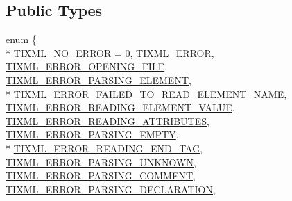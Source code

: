 \subsection*{Public Types}
\begin{DoxyCompactItemize}
\item 
enum \{ \\*
\hyperlink{class_ti_xml_base_a6a1007a163c33d207abfbd8750c9299da750a76ca602241c416d5ec357d55fba1}{T\+I\+X\+M\+L\+\_\+\+N\+O\+\_\+\+E\+R\+R\+O\+R} = 0, 
\hyperlink{class_ti_xml_base_a6a1007a163c33d207abfbd8750c9299dabcabc1b8efabeda1cc4352aa73d64390}{T\+I\+X\+M\+L\+\_\+\+E\+R\+R\+O\+R}, 
\hyperlink{class_ti_xml_base_a6a1007a163c33d207abfbd8750c9299dab803949b8f12e03b5b57f86d9c52b614}{T\+I\+X\+M\+L\+\_\+\+E\+R\+R\+O\+R\+\_\+\+O\+P\+E\+N\+I\+N\+G\+\_\+\+F\+I\+L\+E}, 
\hyperlink{class_ti_xml_base_a6a1007a163c33d207abfbd8750c9299da5cbfcf7fe5e67f0cd1aef98deac55dd2}{T\+I\+X\+M\+L\+\_\+\+E\+R\+R\+O\+R\+\_\+\+P\+A\+R\+S\+I\+N\+G\+\_\+\+E\+L\+E\+M\+E\+N\+T}, 
\\*
\hyperlink{class_ti_xml_base_a6a1007a163c33d207abfbd8750c9299dadcc31ca78a9d507a88c9fafb3d18a3c4}{T\+I\+X\+M\+L\+\_\+\+E\+R\+R\+O\+R\+\_\+\+F\+A\+I\+L\+E\+D\+\_\+\+T\+O\+\_\+\+R\+E\+A\+D\+\_\+\+E\+L\+E\+M\+E\+N\+T\+\_\+\+N\+A\+M\+E}, 
\hyperlink{class_ti_xml_base_a6a1007a163c33d207abfbd8750c9299dafefdc75db23215e846605a2b5af0c2d3}{T\+I\+X\+M\+L\+\_\+\+E\+R\+R\+O\+R\+\_\+\+R\+E\+A\+D\+I\+N\+G\+\_\+\+E\+L\+E\+M\+E\+N\+T\+\_\+\+V\+A\+L\+U\+E}, 
\hyperlink{class_ti_xml_base_a6a1007a163c33d207abfbd8750c9299da670fac23171b64829f90639cc3696d6e}{T\+I\+X\+M\+L\+\_\+\+E\+R\+R\+O\+R\+\_\+\+R\+E\+A\+D\+I\+N\+G\+\_\+\+A\+T\+T\+R\+I\+B\+U\+T\+E\+S}, 
\hyperlink{class_ti_xml_base_a6a1007a163c33d207abfbd8750c9299da5f2aee664733a20f13f6f77556b9fa85}{T\+I\+X\+M\+L\+\_\+\+E\+R\+R\+O\+R\+\_\+\+P\+A\+R\+S\+I\+N\+G\+\_\+\+E\+M\+P\+T\+Y}, 
\\*
\hyperlink{class_ti_xml_base_a6a1007a163c33d207abfbd8750c9299da175f7c72e2f9630bb96ef5137b325502}{T\+I\+X\+M\+L\+\_\+\+E\+R\+R\+O\+R\+\_\+\+R\+E\+A\+D\+I\+N\+G\+\_\+\+E\+N\+D\+\_\+\+T\+A\+G}, 
\hyperlink{class_ti_xml_base_a6a1007a163c33d207abfbd8750c9299da24c814fdcf1d84704869e6f76b19cb6e}{T\+I\+X\+M\+L\+\_\+\+E\+R\+R\+O\+R\+\_\+\+P\+A\+R\+S\+I\+N\+G\+\_\+\+U\+N\+K\+N\+O\+W\+N}, 
\hyperlink{class_ti_xml_base_a6a1007a163c33d207abfbd8750c9299da72e3072a44be499edb89593f6ce10f6c}{T\+I\+X\+M\+L\+\_\+\+E\+R\+R\+O\+R\+\_\+\+P\+A\+R\+S\+I\+N\+G\+\_\+\+C\+O\+M\+M\+E\+N\+T}, 
\hyperlink{class_ti_xml_base_a6a1007a163c33d207abfbd8750c9299da4c200f9d125027ab449e2be7be471ba0}{T\+I\+X\+M\+L\+\_\+\+E\+R\+R\+O\+R\+\_\+\+P\+A\+R\+S\+I\+N\+G\+\_\+\+D\+E\+C\+L\+A\+R\+A\+T\+I\+O\+N}, 

\end{DoxyCompactItemize}
